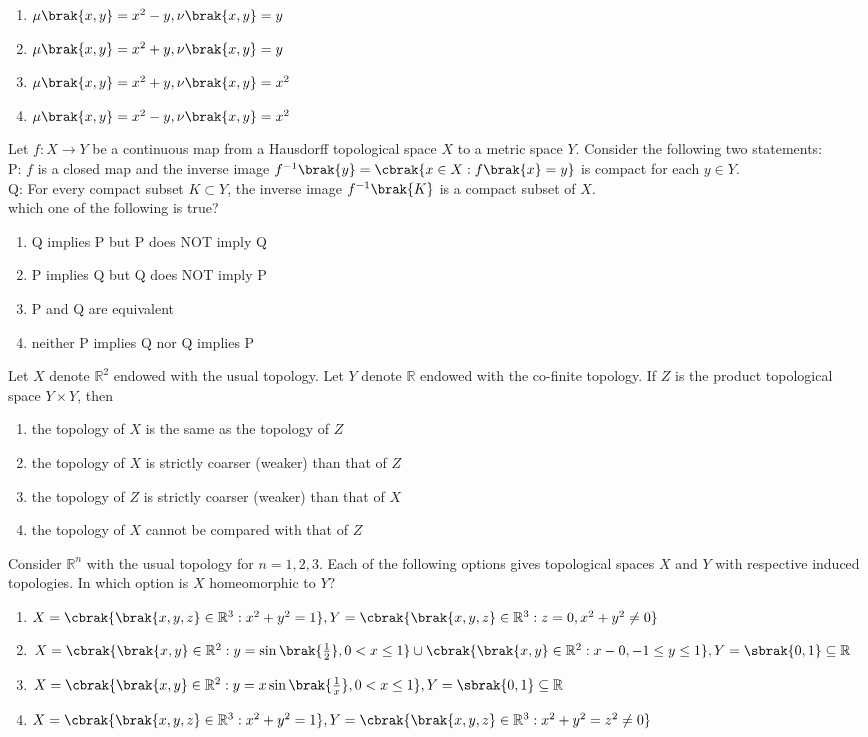 \begin{enumerate}
    \item $\mu\brak{x,y}=x^2-y,\nu\brak{x,y}=y$
    \item $\mu\brak{x,y}=x^2+y,\nu\brak{x,y}=y$
    \item $\mu\brak{x,y}=x^2+y,\nu\brak{x,y}=x^2$
    \item $\mu\brak{x,y}=x^2-y,\nu\brak{x,y}=x^2$
\end{enumerate}
\item Let $f : X\rightarrow Y$ be a continuous map from a Hausdorff topological space $X$ to a metric space $Y$. Consider the following two statements:\\
  P: $f$ is a closed map and the inverse image $f^{-1}\brak{y}=\cbrak{x\in X : f\brak{x}=y} $ is compact for each $y \in Y$.\\
  Q: For every compact subset $K \subset Y$, the inverse image $f^{-1}\brak{K}$ is a compact subset of $X$.\\which one of the following is true?
  \begin{enumerate}
      \item Q implies P but P does NOT imply Q
      \item P implies Q but Q does NOT imply P
      \item P and Q are equivalent
      \item neither P implies Q nor Q implies P
  \end{enumerate}
\item Let $X$ denote $\mathbb{R}^2$ endowed with the usual topology. Let $Y$ denote $\mathbb{R}$ endowed with the co-finite topology. If $Z$ is the product topological space $Y\times Y$, then 
\begin{enumerate}
    \item the topology of $X$ is the same as the topology of $Z$
    \item the topology of $X$ is strictly coarser (weaker) than that of $Z$
    \item the topology of $Z$ is strictly coarser (weaker) than that of $X$
    \item the topology of $X$ cannot be compared with that of $Z$
\end{enumerate}
\item Consider $\mathbb{R}^n$ with the usual topology for $n=1,2,3$. Each of the following options gives topological spaces $X$ and $Y$ with respective induced topologies. In which option is $X$ homeomorphic to $Y$?
\begin{enumerate}
	\item $X=\cbrak{\brak{x,y,z}\in \mathbb{R}^3 : x^2+y^2=1},Y=\cbrak{\brak{x,y,z}\in \mathbb{R}^3 : z=0, x^2+y^2 \neq 0}$
	\item $X=\cbrak{\brak{x,y}\in \mathbb{R}^2 : y=\sin\brak{\frac{1}{2}},0<x\le 1}\cup \cbrak{\brak{x,y}\in \mathbb{R}^2: x-0,-1\le y \le 1},Y=\sbrak{0,1}\subseteq \mathbb{R}$
	\item $X=\cbrak{\brak{x,y}\in \mathbb{R}^2:y=x\sin\brak{\frac{1}{x}},0<x \le 1}, Y=\sbrak{0,1}\subseteq \mathbb{R}$
	\item $X=\cbrak{\brak{x,y,z}\in \mathbb{R}^3 : x^2+y^2=1}, Y=\cbrak{\brak{x,y,z}\in \mathbb{R}^3: x^2+y^2=z^2\neq0}$
\end{enumerate}

